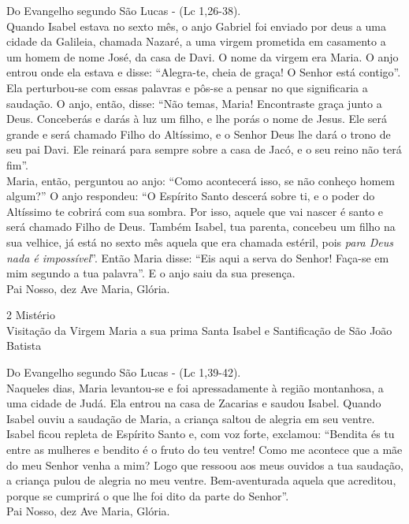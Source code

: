 \documentclass{book}
\begin{document}
\begin{flushleft}
    Do Evangelho segundo São Lucas - (\textcolor{VioletRed2}{Lc 1,26-38}). \\
    \hfill{} \break{}
    Quando Isabel estava no sexto mês, o anjo Gabriel foi enviado por deus a uma cidade da Galileia, chamada Nazaré, a uma virgem prometida em casamento a um homem de nome José, da casa de Davi. O nome da virgem era Maria. O anjo entrou onde ela estava e disse: ``Alegra-te, cheia de graça! O Senhor está contigo''. Ela perturbou-se com essas palavras e pôs-se a pensar no que significaria a saudação. O anjo, então, disse: ``Não temas, Maria! Encontraste graça junto a Deus. Conceberás e darás à luz um filho, e lhe porás o nome de Jesus. Ele será grande e será chamado Filho do Altíssimo, e o Senhor Deus lhe dará o trono de seu pai Davi. Ele reinará para sempre sobre a casa de Jacó, e o seu reino não terá fim''.
    \vspace{.2cm} \\
    Maria, então, perguntou ao anjo: ``Como acontecerá isso, se não conheço homem algum?'' O anjo respondeu: ``O Espírito Santo descerá sobre ti, e o poder do Altíssimo te cobrirá com sua sombra. Por isso, aquele que vai nascer é santo e será chamado Filho de Deus. Também Isabel, tua parenta, concebeu um filho na sua velhice, já está no sexto mês aquela que era chamada estéril, pois \textit{para Deus nada é impossível}''. Então Maria disse: ``Eis aqui a serva do Senhor! Faça-se em mim segundo a tua palavra''. E o anjo saiu da sua presença. \\
    \hfill{} \break{}
    Pai Nosso, dez Ave Maria, Glória.
\end{flushleft}
\newpage
\begin{center}
    2\textordmasculine{} Mistério \\ Visitação da Virgem Maria a sua prima Santa Isabel e Santificação de São João Batista
\end{center}
\begin{flushleft}
    Do Evangelho segundo São Lucas - (\textcolor{VioletRed2}{Lc 1,39-42}). \\
    \hfill{} \break{}
    Naqueles dias, Maria levantou-se e foi apressadamente à região montanhosa, a uma cidade de Judá. Ela entrou na casa de Zacarias e saudou Isabel. Quando Isabel ouviu a saudação de Maria, a criança saltou de alegria em seu ventre. Isabel ficou repleta de Espírito Santo e, com voz forte, exclamou: ``Bendita és tu entre as mulheres e bendito é o fruto do teu ventre! Como me acontece que a mãe do meu Senhor venha a mim? Logo que ressoou aos meus ouvidos a tua saudação, a criança pulou de alegria no meu ventre. Bem-aventurada aquela que acreditou, porque se cumprirá o que lhe foi dito da parte do Senhor''. \\
    \hfill{} \break{}
    Pai Nosso, dez Ave Maria, Glória.
\end{flushleft}
\end{document}
